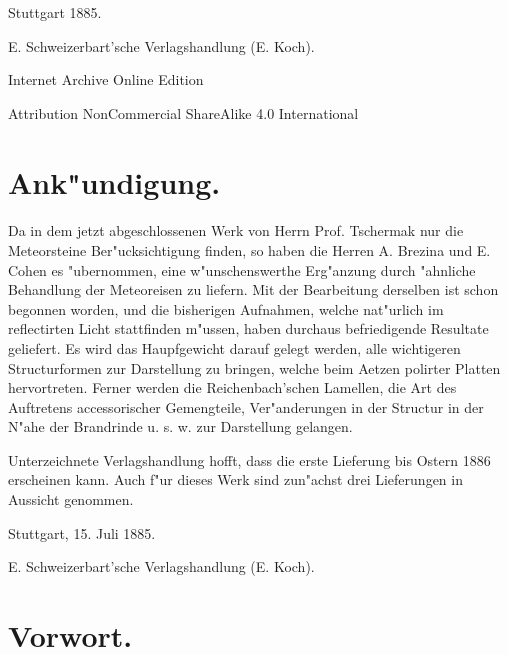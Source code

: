 \documentclass[a4paper, 11pt, oneside, polutonikogreek, german]{article}
\begin{document}
\begin{titlepage}
		
	\vspace*{\fill}%
	
	Stuttgart 1885. %
	
	{\small E. Schweizerbart'sche Verlagshandlung (E. Koch).} %

	\vspace{1\baselineskip} %

    Internet Archive Online Edition  %
	
	{\small Attribution NonCommercial ShareAlike 4.0 International } %
\end{titlepage}
\setlength{\parskip}{1mm plus1mm minus1mm}
\setcounter{tocdepth}{3}
\setcounter{secnumdepth}{3}
\tableofcontents
\clearpage
\section{Ank"undigung.}
\paragraph*{}
Da in dem jetzt abgeschlossenen Werk von Herrn Prof. Tschermak nur die Meteorsteine Ber"ucksichtigung finden, so haben die Herren A. Brezina und E. Cohen es "ubernommen, eine w"unschenswerthe Erg"anzung durch "ahnliche Behandlung der Meteoreisen zu liefern. Mit der Bearbeitung derselben ist schon begonnen worden, und die bisherigen Aufnahmen, welche nat"urlich im reflectirten Licht stattfinden m"ussen, haben durchaus befriedigende Resultate geliefert. Es wird das Haupfgewicht darauf gelegt werden, alle wichtigeren Structurformen zur Darstellung zu bringen, welche beim Aetzen polirter Platten hervortreten. Ferner werden die Reichenbach'schen Lamellen, die Art des Auftretens accessorischer Gemengteile, Ver"anderungen in der Structur in der N"ahe der Brandrinde u. s. w. zur Darstellung gelangen.

Unterzeichnete Verlagshandlung hofft, dass die erste Lieferung bis Ostern 1886 erscheinen kann. Auch f"ur dieses Werk sind zun"achst drei Lieferungen in Aussicht genommen.

Stuttgart, 15. Juli 1885.

\bigskip

E. Schweizerbart'sche Verlagshandlung (E. Koch).
\clearpage
\section{Vorwort.}
\end{document}

